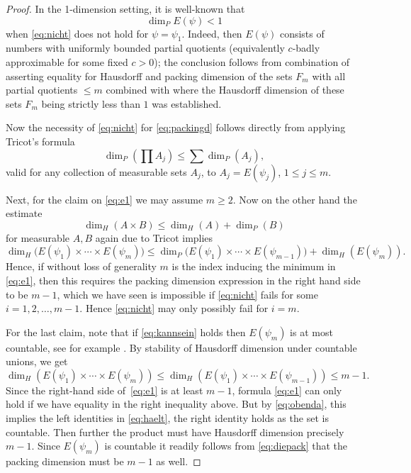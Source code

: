 \documentclass[11pt]{amsart}
\numberwithin{equation}{section}
\newcommand{\0}{\mathbf{0}}
\theoremstyle{remark}
\newcommand{\dimH}{\dim_{H}}
\begin{document}
\begin{proof} In the 1-dimension setting,  it is well-known that 
\[
 \dim_P E(\psi) < 1
\]
when \eqref{eq:nicht} does not hold
for $\psi=\psi_1$. Indeed, then $E(\psi)$ consists
of numbers with uniformly bounded partial quotients 
(equivalently $c$-badly approximable for some
fixed $c>0$);
the conclusion follows from combination of~\cite{MauldinUrbanski4} asserting equality
for Hausdorff and packing dimension of the sets $F_m$
with all partial quotients $\le m$ combined with \cite{BroderickKleinbock}
where
the Hausdorff dimension of these sets $F_m$
being strictly less than $1$ was established.

Now the necessity of \eqref{eq:nicht} for \eqref{eq:packingd} follows
directly from applying Tricot's formula
\begin{equation} \label{eq:diepack}
\dim_P(\prod A_j) \le \sum \dim_P(A_j),
\end{equation}
valid for any collection of measurable sets $A_j$,
to $A_j=E(\psi_j)$, $1\le j\le m$. 

Next, for the claim on \eqref{eq:e1} we may assume $m\ge 2$. Now
on the other hand the estimate
\begin{equation} \label{eq:obenda}
\dim_H(A\times B)\le \dim_H(A) + \dim_P(B)
\end{equation}
for measurable $A,B$ again due to Tricot implies
\[
\dimH\bigl(E(\psi_1)\times\cdots\times E(\psi_m)\bigr)
\le \dim_P\bigl(E(\psi_1)\times\cdots\times E(\psi_{m-1})\bigr) + \dim_H(E(\psi_m)).
\]
Hence, if without loss of generality 
$m$ is the index inducing the minimum 
in \eqref{eq:e1}, then this requires 
the packing dimension expression in the right hand side
to be $m-1$, which we have seen is impossible 
if \eqref{eq:nicht} fails for some $i=1,2,\ldots,m-1$.
Hence \eqref{eq:nicht} may only possibly fail for $i=m$.

For the last claim,  note that 
if \eqref{eq:kannsein} holds then $E(\psi_m)$ is at most countable, see for example
\cite{Bugeaud2008}. By stability of Hausdorff dimension under countable unions, we get
\[
\dimH\!\left(
E(\psi_1)\times\cdots\times E(\psi_m)
\right)
\le \dimH\!\left(
E(\psi_1)\times\cdots\times E(\psi_{m-1})
\right)
\le m-1.
\]
Since the right-hand side of~\eqref{eq:e1} is at least \(m-1\), formula \eqref{eq:e1} can only hold if we have equality in the right inequality above.
But by \eqref{eq:obenda}, this implies the left identities in \eqref{eq:haelt}, the right identity holds as the set is countable. Then 
further the product must have Hausdorff dimension 
precisely $m-1$. Since $E(\psi_m)$ is countable
it readily follows from \eqref{eq:diepack} that the packing dimension must be $m-1$ as well.
\end{proof}
\end{document}
